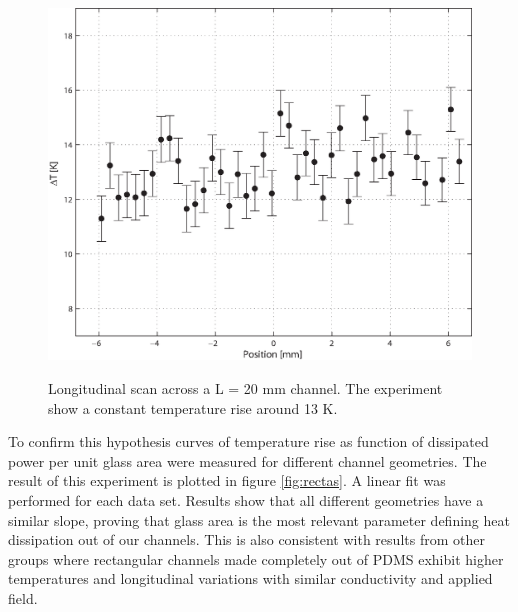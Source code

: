 \documentclass[twocolumn]{svjour3}       %
\begin{document}
\begin{figure}[h!]
\centering
\includegraphics[width=\columnwidth]{figs/long.eps}
\label{fig:long}
\caption{Longitudinal scan across a L = 20 mm channel. The experiment show a constant temperature rise around 13 K. }
\end{figure}

To confirm this hypothesis curves of temperature rise as function of dissipated power per unit glass area were measured for different channel geometries. The result of this experiment is plotted in figure \ref{fig:rectas}. A linear fit was performed for each data set. Results show that all different geometries have a similar slope, proving that glass area is the most relevant parameter defining heat dissipation out of our channels. This is also consistent with results from other groups \cite{competencia1} where rectangular channels made completely out of PDMS exhibit higher temperatures and longitudinal variations with similar conductivity and applied field. 
\end{document}
